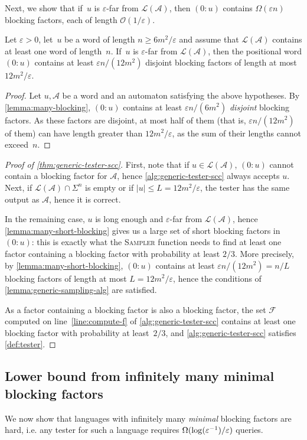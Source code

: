 \documentclass[letterpaper, USenglish, cleveref, autoref, thm-restate, numberwithinsect]{lipics-v2021}
\theoremstyle{theorem}
\theoremstyle{definition}
\newcommand{\Aa}{\mathcal{A}}
\newcommand{\cO}{\mathcal{O}}
\newcommand{\eps}{\varepsilon}
\newcommand{\Ff}{\mathcal{F}}
\newcommand{\lang}[1]{\mathcal{L}(#1)}
\newcommand{\timedword}[2]{(#1:#2)}
\newcommand{\twu}{\timedword{0}{u}}
\newcommand{\epslogeps}[1][]
{\ifthenelse{\equal{#1}{}}{\log(\eps^{-1})/\eps}{\log^{ #1 }(\eps^{-1})/\eps}}
\begin{document}
Next, we show that if~$u$ is $\eps$-far from $\lang{\Aa}$, then $\twu$ contains $\Omega(\eps n)$ blocking factors, each of length $\cO(1/\eps)$.
\begin{lemma}\label{lemma:many-short-blocking} 
    Let $\eps> 0$, let~$u$ be a word of length $n \ge 6m^2/\eps$ and assume that $\lang{\Aa}$ contains at least one word of length~$n$.
    If~$u$ is $\eps$-far from $\lang{\Aa}$, then the positional word $\twu$ contains at least $\eps n/(12m^2)$ disjoint blocking factors of length at most $12m^2/\eps$.
\end{lemma}
\begin{proof}
    Let $u, \Aa$ be a word and an automaton satisfying the above hypotheses.
    By \cref{lemma:many-blocking}, $\twu$ contains at least $\eps n/(6m^2)$ \emph{disjoint} blocking factors.
    As these factors are disjoint, at most half of them (that is, $\eps n/(12m^2)$ of them) can have length greater than $12m^2/\eps$, as the sum of their lengths cannot exceed~$n$.
\end{proof}

\begin{proof}[Proof of \cref{thm:generic-tester-scc}]
    First, note that if $u\in\lang{\Aa}$, $\twu$ cannot contain a blocking factor for $\Aa$, hence \cref{alg:generic-tester-scc} always accepts $u$.
    Next, if $\lang{\Aa} \cap \Sigma^n$ is empty or if $|u| \le L = 12m^2/\eps$, the tester has the same output as $\Aa$, hence it is correct.

    In the remaining case, $u$ is long enough and $\eps$-far from $\lang{\Aa}$, hence \cref{lemma:many-short-blocking} gives us a large set of short blocking factors in $\twu$: this is exactly what the \textsc{Sampler} function needs to find at least one factor containing a blocking factor with probability at least $2/3$.
    More precisely, by \cref{lemma:many-short-blocking}, $\twu$ contains at least $\eps n/(12m^2)= n/L$ blocking factors of length at most $L = 12m^2/\eps$, hence the conditions of \cref{lemma:generic-sampling-alg} are satisfied.

    As a factor containing a blocking factor is also a blocking factor, the set $\Ff$ computed on line~\ref{line:compute-f} of \cref{alg:generic-tester-scc} contains at least one blocking factor with probability at least~$2/3$, and \cref{alg:generic-tester-scc} satisfies \cref{def:tester}.
\end{proof}

\subsection{Lower bound from infinitely many minimal blocking factors}\label{sec:scc-lb}
We now show that languages with infinitely many \emph{minimal} blocking factors are hard, i.e. any tester for such a language requires $\Omega(\epslogeps)$ queries.
\end{document}

